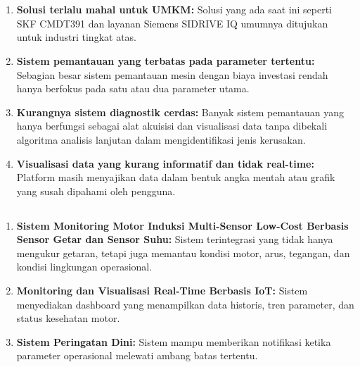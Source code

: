 \documentclass{elsinta}
\begin{document}
\section{\GapAnalysisTitle}

\subsection{\LimitationsTitle}
\begin{enumerate}
    \item \textbf{Solusi terlalu mahal untuk UMKM:} Solusi yang ada saat ini seperti SKF CMDT391 dan layanan Siemens SIDRIVE IQ umumnya ditujukan untuk industri tingkat atas. 
    \item \textbf{Sistem pemantauan yang terbatas pada parameter tertentu:} Sebagian besar sistem pemantauan mesin dengan biaya investasi rendah hanya berfokus pada satu atau dua parameter utama.
    \item \textbf{Kurangnya sistem diagnostik cerdas:} Banyak sistem pemantauan yang hanya berfungsi sebagai alat akuisisi dan visualisasi data tanpa dibekali algoritma analisis lanjutan dalam mengidentifikasi jenis kerusakan.  
    \item \textbf{Visualisasi data yang kurang informatif dan tidak real-time:} Platform masih menyajikan data dalam bentuk angka mentah atau grafik yang susah dipahami oleh pengguna.
\end{enumerate}

\subsection{\ProjectContribsTitle}
\begin{enumerate}
    \item \textbf{Sistem Monitoring Motor Induksi Multi-Sensor Low-Cost Berbasis Sensor Getar dan Sensor Suhu:} Sistem terintegrasi yang tidak hanya mengukur getaran, tetapi juga memantau kondisi motor, arus, tegangan, dan kondisi lingkungan operasional.
    \item \textbf{Monitoring dan Visualisasi Real-Time Berbasis IoT:} Sistem menyediakan dashboard yang menampilkan data historis, tren parameter, dan status kesehatan motor.
    \item \textbf{Sistem Peringatan Dini:} Sistem mampu memberikan notifikasi ketika parameter operasional melewati ambang batas tertentu.
\end{enumerate}
\end{document}
